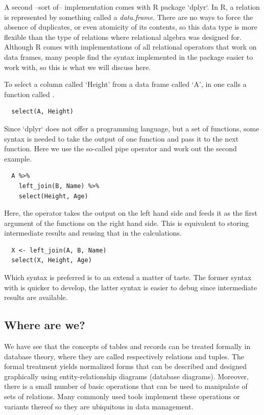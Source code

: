 A second --sort of-- implementation comes with R package `dplyr`.  In R, a
relation is represented by something called a \emph{data.frame}.  There are no
ways to force the absence of duplicates, or even atomicity of its contents, so
this data type is more flexible than the type of relations where relational
algebra was designed for. Although R \citep{Rcore} comes with implementations
of all relational operators that work on data frames, many people find the
syntax implemented in the  package easier to work with, so this is
what we will discuss here.

To select a column called `Height' from a data frame called `A', in
 one calls a function called .
\begin{verbatim}
  select(A, Height)
\end{verbatim}
Since `dplyr` does not offer a programming language, but a set of functions,
some syntax is needed to take the output of one function and pass it to
the next function. Here we use the so-called pipe operator and work out the
second example.
\begin{verbatim}
  A %>% 
    left_join(B, Name) %>%
    select(Height, Age)
\end{verbatim}
Here, the \code{\%>\%} operator takes the output on the left hand side and
feeds it as the first argument of the functions on the right hand side.  This
is equivalent to storing intermediate results and reusing that in the
calculations.
\begin{verbatim}
  X <- left_join(A, B, Name)
  select(X, Height, Age)
\end{verbatim}
Which syntax is preferred is to an extend a matter of taste. The former syntax
with \code{\%>\%} is quicker to develop, the latter syntax is easier to debug
since intermediate results are available.










\subsection*{Where are we?}
We have see that the concepts of tables and records can be treated formally in
database theory, where they are called respectively relations and tuples.  The
formal treatment yields normalized forms that can be described and designed
graphically using entity-relationship diagrams (database diagrams).  Moreover,
there is a small number of basic operations that can be used to manipulate of
sets of relations. Many commonly used tools implement these operations or
variants thereof so they are ubiquitous in data management.


